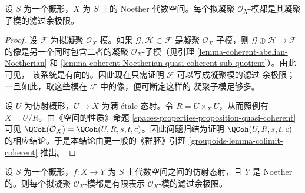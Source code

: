 \begin{lemma}
\label{lemma-directed-colimit-coherent}
设 $S$ 为一个概形，$X$ 为 $S$ 上的 Noether 代数空间。每个拟凝聚
$\mathcal{O}_X$-模都是其凝聚子模的滤过余极限。
\end{lemma}

\begin{proof}
设 $\mathcal{F}$ 为拟凝聚 $\mathcal{O}_X$-模。如果
$\mathcal{G}, \mathcal{H} \subset \mathcal{F}$ 是凝聚
$\mathcal{O}_X$-子模，则 $\mathcal{G} \oplus \mathcal{H} \to \mathcal{F}$
的像是另一个同时包含二者的凝聚 $\mathcal{O}_X$-子模（见引理
\ref{lemma-coherent-abelian-Noetherian} 和
\ref{lemma-coherent-Noetherian-quasi-coherent-sub-quotient}）。由此可见，
该系统是有向的。因此现在只需证明 $\mathcal{F}$ 可以写成凝聚模的滤过
余极限；一旦如此，取这些模在 $\mathcal{F}$ 中的像，便可断定这样的
凝聚子模足够多。

\medskip\noindent
设 $U$ 为仿射概形，$U \to X$ 为满 \'etale 态射。令
$R = U \times_X U$，从而照例有 $X = U/R$。由《空间的性质》命题
\ref{spaces-properties-proposition-quasi-coherent}
可见 $\QCoh(\mathcal{O}_X) = \QCoh(U, R, s, t, c)$。因此问题归结为证明
$\QCoh(U, R, s, t, c)$ 的相应结论。于是本结论由更一般的《群胚》引理
\ref{groupoids-lemma-colimit-coherent} 推出。
\end{proof}

\begin{lemma}
\label{lemma-direct-colimit-finite-presentation}
设 $S$ 为一个概形，$f : X \to Y$ 为 $S$ 上代数空间之间的仿射态射，且
$Y$ 是 Noether 的。则每个拟凝聚 $\mathcal{O}_X$-模都是有限表示
$\mathcal{O}_X$-模的滤过余极限。
\end{lemma}

